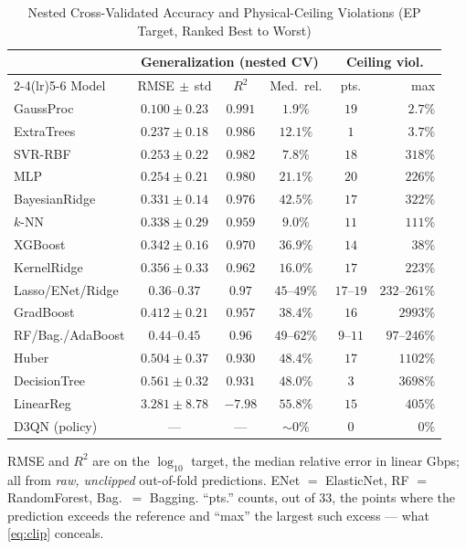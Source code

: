 \documentclass[journal]{IEEEtran}
\begin{document}
\begin{table}[!tbp]
\centering
\caption{Nested Cross-Validated Accuracy and Physical-Ceiling Violations
(EP Target, Ranked Best to Worst)}
\label{tab:cv}
\setlength{\tabcolsep}{2.5pt}
\scriptsize
\begin{tabular}{@{}l c c c c r@{}}
\toprule
& \multicolumn{3}{c}{Generalization (nested CV)} & \multicolumn{2}{c}{Ceiling viol.}\\
\cmidrule(lr){2-4}\cmidrule(lr){5-6}
Model & RMSE$\,\pm\,$std & $R^2$ & Med.\ rel. & pts. & max\\
\midrule
GaussProc           & $0.100\pm0.23$ & $0.991$  & $1.9\%$      & $19$       & $2.7\%$\\
ExtraTrees          & $0.237\pm0.18$ & $0.986$  & $12.1\%$     & $1$        & $3.7\%$\\
SVR-RBF             & $0.253\pm0.22$ & $0.982$  & $7.8\%$      & $18$       & $318\%$\\
MLP                 & $0.254\pm0.21$ & $0.980$  & $21.1\%$     & $20$       & $226\%$\\
BayesianRidge       & $0.331\pm0.14$ & $0.976$  & $42.5\%$     & $17$       & $322\%$\\
$k$-NN              & $0.338\pm0.29$ & $0.959$  & $9.0\%$      & $11$       & $111\%$\\
XGBoost             & $0.342\pm0.16$ & $0.970$  & $36.9\%$     & $14$       & $38\%$\\
KernelRidge         & $0.356\pm0.33$ & $0.962$  & $16.0\%$     & $17$       & $223\%$\\
Lasso/ENet/Ridge    & $0.36$--$0.37$ & $0.97$   & $45$--$49\%$ & $17$--$19$ & $232$--$261\%$\\
GradBoost           & $0.412\pm0.21$ & $0.957$  & $38.4\%$     & $16$       & $2993\%$\\
RF/Bag./AdaBoost    & $0.44$--$0.45$ & $0.96$   & $49$--$62\%$ & $9$--$11$  & $97$--$246\%$\\
Huber               & $0.504\pm0.37$ & $0.930$  & $48.4\%$     & $17$       & $1102\%$\\
DecisionTree        & $0.561\pm0.32$ & $0.931$  & $48.0\%$     & $3$        & $3698\%$\\
LinearReg           & $3.281\pm8.78$ & $-7.98$  & $55.8\%$     & $15$       & $405\%$\\
\midrule
D3QN (policy)       & ---            & ---      & $\sim\!0\%$  & $0$        & $0\%$\\
\bottomrule
\end{tabular}
\vspace{2pt}
\parbox{\columnwidth}{\scriptsize RMSE and $R^2$ are on the $\log_{10}$ target, the median
relative error in linear Gbps; all from \emph{raw, unclipped} out-of-fold predictions.
ENet $=$ ElasticNet, RF $=$ RandomForest, Bag.\ $=$ Bagging. ``pts.'' counts, out of $33$,
the points where the prediction exceeds the reference and ``max'' the largest such excess
--- what \eqref{eq:clip} conceals.}
\end{table}
\end{document}
